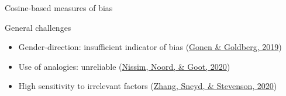 \documentclass[
  10pt,
  ignorenonframetext,
  x11names, dvipsnames, bibspacing,natbib, table]{beamer}
\providecommand{\tightlist}{%
  \setlength{\itemsep}{0pt}\setlength{\parskip}{0pt}}
\begin{document}
\begin{frame}{Cosine-based measures of bias}
\protect\hypertarget{cosine-based-measures-of-bias-7}{}
\begin{block}{General challenges}
\protect\hypertarget{general-challenges}{}
\begin{itemize}
\tightlist
\item
  Gender-direction: insufficient indicator of bias
  \footnotesize  (\protect\hyperlink{ref-Gonen2019lipstick}{Gonen \&
  Goldberg, 2019})
\end{itemize}

\normalsize

\begin{itemize}
\item
  Use of analogies: unreliable
  \footnotesize  (\protect\hyperlink{ref-Nissim2020fair}{Nissim, Noord,
  \& Goot, 2020}) \normalsize
\item
  High sensitivity to irrelevant factors
  \footnotesize  (\protect\hyperlink{ref-zhang2020robustness}{Zhang,
  Sneyd, \& Stevenson, 2020}) \normalsize
\end{itemize}
\end{block}
\end{frame}
\end{document}
